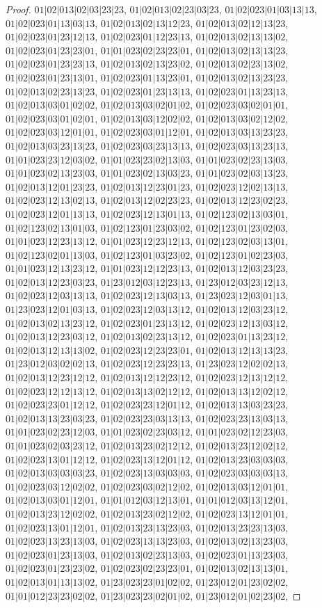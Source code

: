 \documentclass[12pt]{article}
\theoremstyle{plain}
\theoremstyle{definition}
\theoremstyle{remark}
\begin{document}
\begin{proof}
$01|02|013|02|03|23|23$, $01|02|013|02|23|03|23$, $01|02|023|01|03|13|13$, $01|02|023|01|13|03|13$, $01|02|013|02|13|12|23$, $01|02|013|02|12|13|23$, $01|02|023|01|23|12|13$, $01|02|023|01|12|23|13$, $01|02|013|02|13|13|02$, $01|02|023|01|23|23|01$, $01|01|023|02|23|23|01$, $01|02|013|02|13|13|23$, $01|02|023|01|23|23|13$, $01|02|013|02|13|23|02$, $01|02|013|02|23|13|02$, $01|02|023|01|23|13|01$, $01|02|023|01|13|23|01$, $01|02|013|02|13|23|23$, $01|02|013|02|23|13|23$, $01|02|023|01|23|13|13$, $01|02|023|01|13|23|13$, $01|02|013|03|01|02|02$, $01|02|013|03|02|01|02$, $01|02|023|03|02|01|01$, $01|02|023|03|01|02|01$, $01|02|013|03|12|02|02$, $01|02|013|03|02|12|02$, $01|02|023|03|12|01|01$, $01|02|023|03|01|12|01$, $01|02|013|03|13|23|23$, $01|02|013|03|23|13|23$, $01|02|023|03|23|13|13$, $01|02|023|03|13|23|13$, $01|01|023|23|12|03|02$, $01|01|023|23|02|13|03$, $01|01|023|02|23|13|03$, $01|01|023|02|13|23|03$, $01|01|023|02|13|03|23$, $01|01|023|02|03|13|23$, $01|02|013|12|01|23|23$, $01|02|013|12|23|01|23$, $01|02|023|12|02|13|13$, $01|02|023|12|13|02|13$, $01|02|013|12|02|23|23$, $01|02|013|12|23|02|23$, $01|02|023|12|01|13|13$, $01|02|023|12|13|01|13$, $01|02|123|02|13|03|01$, $01|02|123|02|13|01|03$, $01|02|123|01|23|03|02$, $01|02|123|01|23|02|03$, $01|01|023|12|23|13|12$, $01|01|023|12|23|12|13$, $01|02|123|02|03|13|01$, $01|02|123|02|01|13|03$, $01|02|123|01|03|23|02$, $01|02|123|01|02|23|03$, $01|01|023|12|13|23|12$, $01|01|023|12|12|23|13$, $01|02|013|12|03|23|23$, $01|02|013|12|23|03|23$, $01|23|012|03|12|23|13$, $01|23|012|03|23|12|13$, $01|02|023|12|03|13|13$, $01|02|023|12|13|03|13$, $01|23|023|12|03|01|13$, $01|23|023|12|01|03|13$, $01|02|023|12|03|13|12$, $01|02|013|12|03|23|12$, $01|02|013|02|13|23|12$, $01|02|023|01|23|13|12$, $01|02|023|12|13|03|12$, $01|02|013|12|23|03|12$, $01|02|013|02|23|13|12$, $01|02|023|01|13|23|12$, $01|02|013|12|13|13|02$, $01|02|023|12|23|23|01$, $01|02|013|12|13|13|23$, $01|23|012|03|02|02|13$, $01|02|023|12|23|23|13$, $01|23|023|12|02|02|13$, $01|02|013|12|23|12|12$, $01|02|013|12|12|23|12$, $01|02|023|12|13|12|12$, $01|02|023|12|12|13|12$, $01|02|013|13|02|12|12$, $01|02|013|13|12|02|12$, $01|02|023|23|01|12|12$, $01|02|023|23|12|01|12$, $01|02|013|13|03|23|23$, $01|02|013|13|23|03|23$, $01|02|023|23|03|13|13$, $01|02|023|23|13|03|13$, $01|01|023|02|23|12|03$, $01|01|023|02|23|03|12$, $01|01|023|02|12|23|03$, $01|01|023|02|03|23|12$, $01|02|013|23|02|12|12$, $01|02|013|23|12|02|12$, $01|02|023|13|01|12|12$, $01|02|023|13|12|01|12$, $01|02|013|23|03|03|03$, $01|02|013|03|03|03|23$, $01|02|023|13|03|03|03$, $01|02|023|03|03|03|13$, $01|02|023|03|12|02|02$, $01|02|023|03|02|12|02$, $01|02|013|03|12|01|01$, $01|02|013|03|01|12|01$, $01|01|012|03|12|13|01$, $01|01|012|03|13|12|01$, $01|02|013|23|12|02|02$, $01|02|013|23|02|12|02$, $01|02|023|13|12|01|01$, $01|02|023|13|01|12|01$, $01|02|013|23|13|23|03$, $01|02|013|23|23|13|03$, $01|02|023|13|23|13|03$, $01|02|023|13|13|23|03$, $01|02|013|02|13|23|03$, $01|02|023|01|23|13|03$, $01|02|013|02|23|13|03$, $01|02|023|01|13|23|03$, $01|02|023|01|23|23|02$, $01|02|023|02|23|23|01$, $01|02|013|02|13|13|01$, $01|02|013|01|13|13|02$, $01|23|023|23|01|02|02$, $01|23|012|01|23|02|02$, $01|01|012|23|23|02|02$, $01|23|023|23|02|01|02$, $01|23|012|01|02|23|02$, 
\end{proof}
\end{document}
